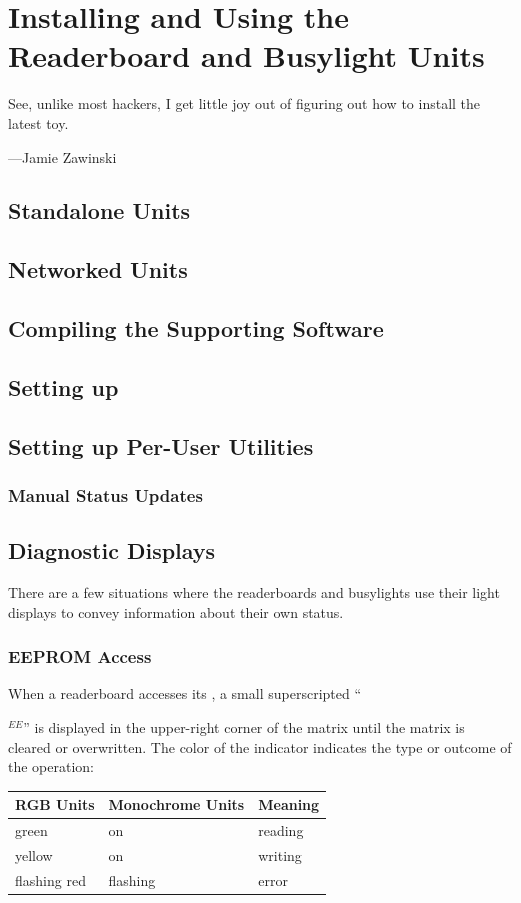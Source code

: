 \chapter{Installing and Using the Readerboard and Busylight Units}
\epigraph{See, unlike most hackers, I get little joy out of figuring out how to install the latest toy.}{---Jamie Zawinski}
\section{Standalone Units}
\section{Networked Units}
\section{Compiling the Supporting Software}
\section{Setting up }
\section{Setting up Per-User Utilities}
\subsection{}
\subsection{}
\subsection{Manual Status Updates}
\section{Diagnostic Displays}
There are a few situations where the readerboards and busylights use their light displays to convey
information about their own status.

\subsection{EEPROM Access}
When a readerboard accesses its , a small superscripted ``\strut$^{EE}$'' is displayed
in the upper-right corner of the matrix until the matrix is cleared or overwritten.
The color of the indicator indicates the type or outcome of the operation:
\begin{center}
	\begin{tabular}{lll}\toprule
		\bfseries RGB Units & \bfseries Monochrome Units & \bfseries Meaning\\\midrule
		green & on & reading \\
		yellow & on & writing \\
		flashing red & flashing & error \\
		\bottomrule
	\end{tabular}
\end{center}

